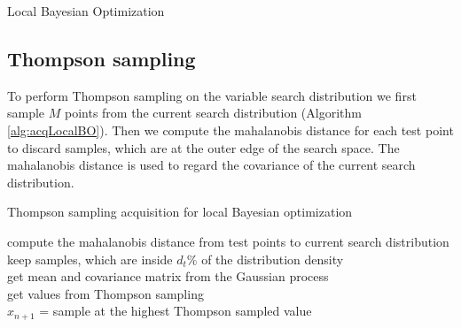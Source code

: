 \begin{algorithm}[t]
   \caption{Local Bayesian Optimization\label{alg:localBO}}

   \BlankLine
\end{algorithm}


\subsection{Thompson sampling}

To perform Thompson sampling on the variable search distribution we first sample $M$ points from the current search distribution (Algorithm \ref{alg:acqLocalBO}). Then we compute the mahalanobis distance for each test point to discard samples, which are at the outer edge of the search space. The mahalanobis distance is used to regard the covariance of the current search distribution.

\begin{algorithm}
    \caption{Thompson sampling acquisition for local Bayesian optimization\label{alg:acqLocalBO}}
    \BlankLine

    compute the mahalanobis distance from test points to current search distribution\\
    keep samples, which are inside $d_t\%$ of the distribution density\\
    get mean and covariance matrix from the Gaussian process\\
    get values from Thompson sampling\\
    $x_{n+1}$ = sample at the highest Thompson sampled value\\
\end{algorithm}

